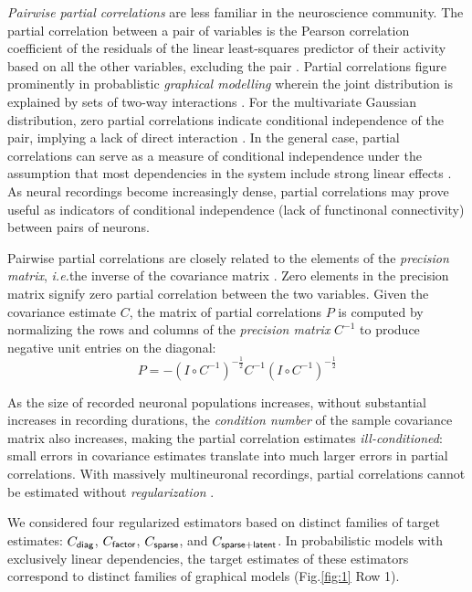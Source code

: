 \documentclass[10pt]{article}
\newcommand{\figref}[2]{Fig.\;\ref{fig:#1}\,#2}
\newcommand{\ie}{\emph{i.e.}\;}
\begin{document}
\emph{Pairwise partial correlations} are less familiar in the neuroscience community. 
The partial correlation between a pair of variables is the Pearson correlation coefficient of the residuals of the linear least-squares predictor of their activity based on all the other variables, excluding the pair \cite{Anderson:2003, Whittaker:1990}. Partial correlations figure prominently in probablistic \emph{graphical modelling} wherein the joint distribution is explained by sets of two-way interactions \cite{Whittaker:1990}. For the multivariate Gaussian distribution, zero partial correlations indicate conditional independence of the pair, implying a lack of direct interaction \cite{Dempster:1972, Whittaker:1990}. In the general case, partial correlations can serve as a measure of conditional independence under the assumption that most dependencies in the system include strong linear effects \cite{Whittaker:1990,Baba:2004}. As neural recordings become increasingly dense, partial correlations may prove useful as indicators of conditional independence (lack of functinonal connectivity) between pairs of neurons.

Pairwise partial correlations are closely related to the elements of the \emph{precision matrix}, \ie the inverse of the covariance matrix \cite{Dempster:1972,Whittaker:1990}. Zero elements in the precision matrix signify zero partial correlation between the two variables. Given the covariance estimate $C$, the matrix of partial correlations $P$ is computed by normalizing the rows and columns of the \emph{precision matrix} $C^{-1}$ to produce negative unit entries on the diagonal:
\begin{equation}\label{eq:partial}
    P = -\left(I\circ C^{-1}\right)^{-\frac 1 2} C^{-1} \left(I\circ C^{-1}\right)^{-\frac 1 2}
\end{equation}

As the size of recorded neuronal populations increases, without substantial increases in recording durations, the \emph{condition number} of the sample covariance matrix also increases, making the partial correlation estimates \emph{ill-conditioned}: small errors in covariance estimates translate into much larger errors in partial correlations. With massively multineuronal recordings, partial correlations cannot be estimated without \emph{regularization} \cite{Ledoit:2004,Schafer:2005}.

We considered four regularized estimators based on distinct families of target estimates: $C_{\sf diag}$, $C_{\sf factor}$, $C_{\sf sparse}$, and $C_{\sf sparse+latent}$. In probabilistic models with exclusively linear dependencies, the target estimates of these estimators correspond to distinct families of graphical models (\figref{1}{\,Row 1}).  
\end{document}
